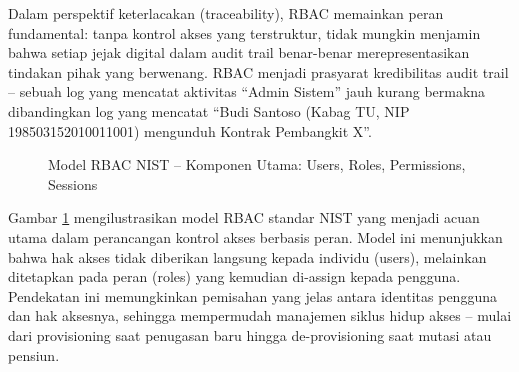 \documentclass[12pt,a4paper]{report}
\begin{document}
Dalam perspektif keterlacakan (traceability), RBAC memainkan peran fundamental: tanpa kontrol akses yang terstruktur, tidak mungkin menjamin bahwa setiap jejak digital dalam audit trail benar-benar merepresentasikan tindakan pihak yang berwenang. RBAC menjadi prasyarat kredibilitas audit trail -- sebuah log yang mencatat aktivitas ``Admin Sistem'' jauh kurang bermakna dibandingkan log yang mencatat ``Budi Santoso (Kabag TU, NIP 198503152010011001) mengunduh Kontrak Pembangkit X''.


\begin{figure}[H]
\centering
{}%
\caption{Model RBAC NIST -- Komponen Utama: Users, Roles, Permissions, Sessions}
\label{fig:rbac-nist-model}
\end{figure}

\small Gambar \ref{fig:rbac-nist-model} mengilustrasikan model RBAC standar NIST yang menjadi acuan utama dalam perancangan kontrol akses berbasis peran. Model ini menunjukkan bahwa hak akses tidak diberikan langsung kepada individu (users), melainkan ditetapkan pada peran (roles) yang kemudian di-assign kepada pengguna. Pendekatan ini memungkinkan pemisahan yang jelas antara identitas pengguna dan hak aksesnya, sehingga mempermudah manajemen siklus hidup akses -- mulai dari provisioning saat penugasan baru hingga de-provisioning saat mutasi atau pensiun.
\end{document}
